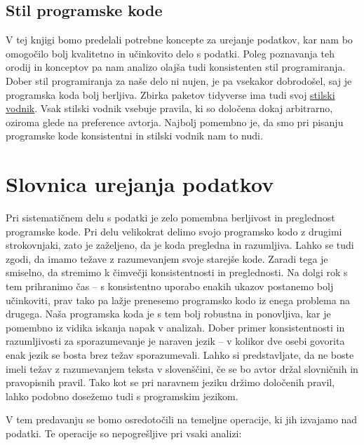 \documentclass[
]{book}
\begin{document}
\hypertarget{stil-programske-kode}{%
\section*{Stil programske kode}\label{stil-programske-kode}}

V tej knjigi bomo predelali potrebne koncepte za urejanje podatkov, kar nam bo omogočilo bolj kvalitetno in učinkovito delo s podatki. Poleg poznavanja teh orodij in konceptov pa nam analizo olajša tudi konsistenten stil programiranja. Dober stil programiranja za naše delo ni nujen, je pa vsekakor dobrodošel, saj je programska koda bolj berljiva. Zbirka paketov tidyverse ima tudi svoj \href{https://style.tidyverse.org/}{stilski vodnik}. Vsak stilski vodnik vsebuje pravila, ki so določena dokaj arbitrarno, oziroma glede na preference avtorja. Najbolj pomembno je, da smo pri pisanju programske kode konsistentni in stilski vodnik nam to nudi.

\hypertarget{slovnica-urejanja-podatkov}{%
\chapter{Slovnica urejanja podatkov}\label{slovnica-urejanja-podatkov}}

Pri sistematičnem delu s podatki je zelo pomembna berljivost in preglednost programske kode. Pri delu velikokrat delimo svojo programsko kodo z drugimi strokovnjaki, zato je zaželjeno, da je koda pregledna in razumljiva. Lahko se tudi zgodi, da imamo težave z razumevanjem svoje starejše kode. Zaradi tega je smiselno, da stremimo k čimvečji konsistentnosti in preglednosti. Na dolgi rok s tem prihranimo čas -- s konsistentno uporabo enakih ukazov postanemo bolj učinkoviti, prav tako pa lažje prenesemo programsko kodo iz enega problema na drugega. Naša programska koda je s tem bolj robustna in ponovljiva, kar je pomembno iz vidika iskanja napak v analizah. Dober primer konsistentnosti in razumljivosti za sporazumevanje je naraven jezik -- v kolikor dve osebi govorita enak jezik se bosta brez težav sporazumevali. Lahko si predstavljate, da ne boste imeli težav z razumevanjem teksta v slovenščini, če se bo avtor držal slovničnih in pravopisnih pravil. Tako kot se pri naravnem jeziku držimo določenih pravil, lahko podobno dosežemo tudi s programskim jezikom.

V tem predavanju se bomo osredotočili na temeljne operacije, ki jih izvajamo nad podatki. Te operacije so nepogrešljive pri vsaki analizi:
\end{document}

